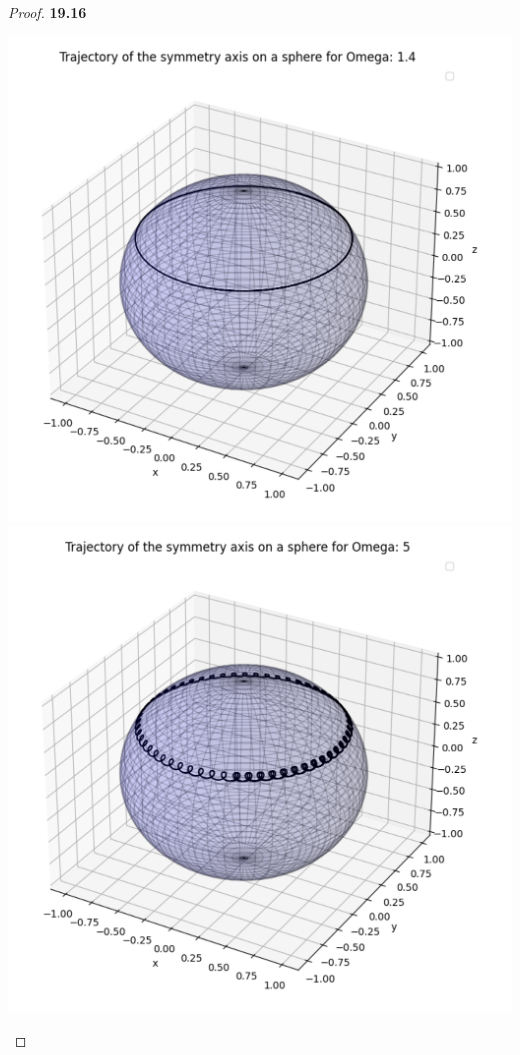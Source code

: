 \documentclass[11pt]{article}
\theoremstyle{definition}
\begin{document}
\begin{proof}{\textbf{19.16}}
\begin{center}
        \includegraphics[scale=0.4]{ch19-16-2.png}
        \includegraphics[scale=0.4]{ch19-16-3.png}

\end{center}
\end{proof}
\end{document}
